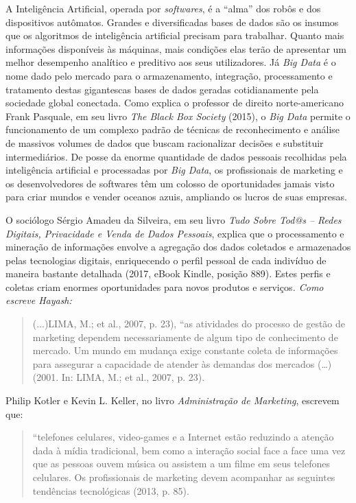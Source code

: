 A Inteligência Artificial, operada por \emph{softwares}, é a ``alma''
dos robôs e dos dispositivos autômatos. Grandes e diversificadas bases
de dados são os insumos que os algoritmos de inteligência artificial
precisam para trabalhar. Quanto mais informações disponíveis às
máquinas, mais condições elas terão de apresentar um melhor desempenho
analítico e preditivo aos seus utilizadores. Já \emph{Big Data} é o nome
dado pelo mercado para o armazenamento, integração, processamento e
tratamento destas gigantescas bases de dados geradas cotidianamente pela
sociedade global conectada. Como explica o professor de direito
norte-americano Frank Pasquale, em seu livro \emph{The Black Box
Society} (2015), o \emph{Big Data} permite o funcionamento de um
complexo padrão de técnicas de reconhecimento e análise de massivos
volumes de dados que buscam racionalizar decisões e substituir
intermediários. De posse da enorme quantidade de dados pessoais
recolhidas pela inteligência artificial e processadas por \emph{Big
Data}, os profissionais de marketing e os desenvolvedores de softwares
têm um colosso de oportunidades jamais visto para criar mundos e vender
oceanos azuis, ampliando os lucros de suas empresas.

O sociólogo Sérgio Amadeu da Silveira, em seu livro \emph{Tudo Sobre Tod@s -- Redes Digitais, Privacidade e Venda
de Dados Pessoais}, explica que o processamento e mineração de
informações envolve a agregação dos dados coletados e armazenados pelas
tecnologias digitais, enriquecendo o perfil pessoal de cada indivíduo de
maneira bastante detalhada (2017, eBook Kindle, posição 889). Estes
perfis e coletas criam enormes oportunidades para novos produtos e
serviços\emph{. Como escreve Hayash:}

\begin{quote}
(...)LIMA, M.; et al., 2007, p. 23), ``as atividades do processo de
gestão de marketing dependem necessariamente de algum tipo de
conhecimento de mercado. Um mundo em mudança exige constante coleta de
informações para assegurar a capacidade de atender às demandas dos
mercados (\ldots{}) (2001. In: LIMA, M.; et al., 2007, p. 23).
\end{quote}

Philip Kotler e Kevin L. Keller, no livro \emph{Administração de
Marketing}, escrevem que:

\begin{quote}
``telefones celulares, video-games e a Internet estão reduzindo a
atenção dada à mídia tradicional, bem como a interação social face a
face uma vez que as pessoas ouvem música ou assistem a um filme em seus
telefones celulares. Os profissionais de marketing devem acompanhar as
seguintes tendências tecnológicas (2013, p. 85).
\end{quote}

